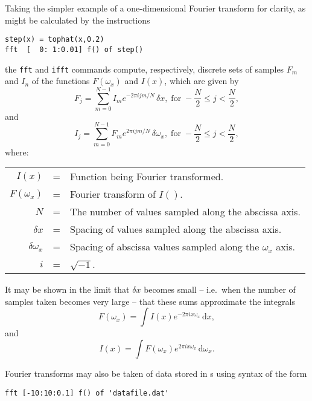 Taking the simpler example of a one-dimensional Fourier transform for clarity,
as might be calculated by the instructions
\begin{verbatim}
step(x) = tophat(x,0.2)
fft  [  0: 1:0.01] f() of step()
\end{verbatim}
the {\tt fft} and {\tt ifft} commands compute,
respectively, discrete sets of samples $F_m$ and $I_n$ of the functions
$F(\omega_x)$ and $I(x)$, which are given by
\begin{displaymath}
F_j = \sum_{m=0}^{N-1} I_m e^{-2\pi ijm/N} \,\delta x,\;\textrm{for}\; -\frac{N}{2}\leq j <\frac{N}{2} ,
\end{displaymath}
\noindent and
\begin{displaymath}
I_j = \sum_{m=0}^{N-1} F_m e^{ 2\pi ijm/N} \,\delta \omega_x,\;\textrm{for}\; -\frac{N}{2}\leq j <\frac{N}{2} ,
\end{displaymath}
\noindent where:
\begin{tabular}{rcp{9cm}}
$I(x)$        & = & Function being Fourier transformed. \\
$F(\omega_x)$ & = & Fourier transform of $I()$. \\
$N$           & = & The number of values sampled along the abscissa axis. \\
$\delta x$    & = & Spacing of values sampled along the abscissa axis. \\
$\delta \omega_x$ & = & Spacing of abscissa values sampled along the $\omega_x$ axis. \\
$i$           & = & $\sqrt{-1}$. \\
\end{tabular}
\vspace{2mm}

It may be shown in the limit that $\delta x$ becomes small -- i.e.\ when the
number of samples taken becomes very large -- that these sums approximate the
integrals
\begin{equation}
F(\omega_x) = \int I(x) e^{-2\pi ix\omega_x} \,\mathrm{d}x ,
\end{equation}
\noindent and
\begin{equation}
I(x) = \int F(\omega_x) e^{ 2\pi ix\omega_x} \,\mathrm{d}\omega_x .
\end{equation}

Fourier transforms may also be taken of data stored in \datafile s using syntax
of the form
\begin{verbatim}
fft [-10:10:0.1] f() of 'datafile.dat'
\end{verbatim}

